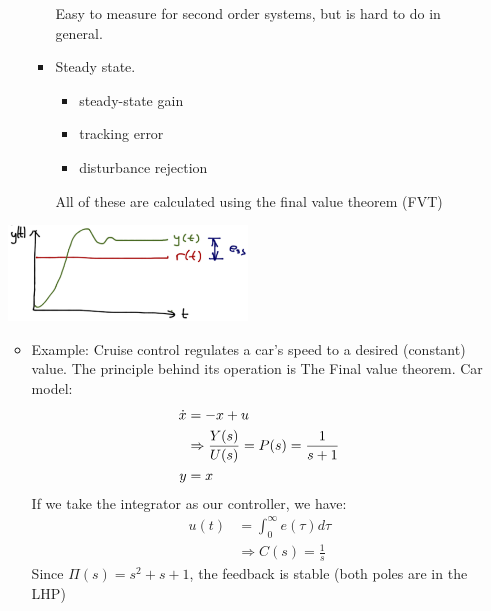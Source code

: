 \begin{enumerate}
\begin{itemize}
\begin{itemize}
                            Easy to measure for second order systems, but is hard to do in general.

                        \item Steady state.
                            \begin{itemize}
                                \item steady-state gain
                                \item tracking error
                                \item disturbance rejection
                            \end{itemize}
                            All of these are calculated using the final value theorem (FVT)
                    \end{itemize}
            \end{itemize}
            \begin{center}\includegraphics[width=0.5\textwidth,keepaspectratio]{images/5-10-a.png}\end{center}

            \begin{itemize}
                \item Example:
                    Cruise control regulates a car's speed to a desired (constant) value.
                    The principle behind its operation is The Final value theorem.
                    Car model:
                    \begin{align*}
                        \dot{x} &= -x + u \\
                        &\Rightarrow \frac{Y(s)}{U(s)} = P(s) = \frac{1}{s+1} \\
                        y &= x
                    \end{align*}
                    If we take the integrator as our controller, we have:
                    \begin{align*}
                        u(t) &= \int_0^{\infty} e(\tau)d\tau \\
                        & \Rightarrow C(s) = \frac{1}{s}
                    \end{align*}
                    Since $\Pi(s) = s^2 + s + 1$, the feedback is stable (both poles are in the LHP)


\end{itemize}
\end{enumerate}
